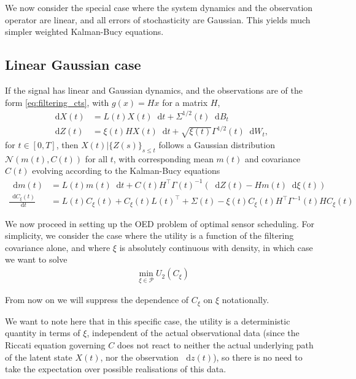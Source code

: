 \documentclass[10pt]{article}
\numberwithin{equation}{section}
\numberwithin{figure}{section}
\theoremstyle{remark}
\newcommand{\cP}{\mathcal P}
\newcommand{\cN}{\mathcal N}
\newcommand{\dd }{\mathop{}\!\mathrm{d}}
\begin{document}
We now consider the special case where the system dynamics and the observation operator are linear, and all errors of stochasticity are Gaussian. This yields much simpler weighted Kalman-Bucy equations.
\subsection{Linear Gaussian case}
If the signal has linear and Gaussian dynamics, and the observations are of the form \eqref{eq:filtering_cts}, with $g(x)=Hx$ for a matrix $H$,
\begin{equation}\label{eq:linear_Gauss_weighted}
\begin{split}
    \dd X(t) &= L(t) X(t)\dd t + \Sigma^{1/2}(t)\dd B_t\\
    \dd Z(t) &= \xi(t)H X(t)\dd t + \sqrt{\xi(t)} \Gamma^{1/2}(t)\dd W_t,
\end{split}
\end{equation}
for $t\in [0,T]$, then $X(t)|\{Z(s)\}_{s\leq t}$ follows a Gaussian distribution $\cN(m(t), C(t))$ for all $t$, with corresponding mean $m(t)$ and covariance $C(t)$ evolving according to the Kalman-Bucy equations
\begin{equation}\label{eq:Kalman_Bucy_weighted}
\begin{split}
    \dd m(t) &= L(t) m(t) \dd t+ C(t) H^\top\Gamma(t)^{-1}\left(\dd Z(t)- Hm(t)\dd \xi(t) \right)\\
    \frac{\dd C_\xi(t)}{\dd t} &=L(t) C_\xi(t) + C_\xi(t) L(t)^\top + \Sigma(t) - \xi(t) C_\xi(t) H^\top \Gamma^{-1}(t) H C_\xi(t)
\end{split}
\end{equation}

We now proceed in setting up the OED problem of optimal sensor scheduling. For simplicity, we consider the case where the utility is a function of the filtering covariance alone, and where $\xi$ is absolutely continuous with density, in which case we want to solve
\begin{align*}
    &\min_{\xi \in \cP} U_2(C_\xi)
\end{align*}


From now on we will suppress the dependence of $C_\xi$ on $\xi$ notationally.

We want to note here that in this specific case, the utility is a deterministic quantity in terms of $\xi$, independent of the actual observational data (since the Riccati equation governing $C$ does not react to neither the actual underlying path of the latent state $X(t)$, nor the observation $\dd z(t)$), so there is no need to take the expectation over possible realisations of this data.
\end{document}
